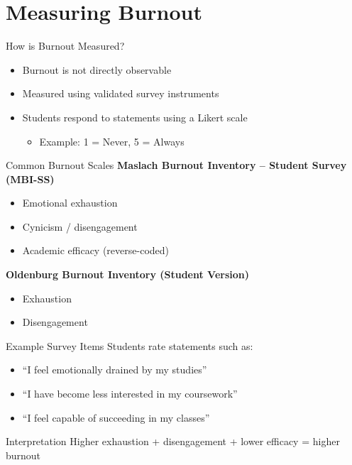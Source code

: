 \documentclass[dvipsnames]{beamer}
\begin{document}
\section{Measuring Burnout}

\begin{frame}{How is Burnout Measured?}
\begin{itemize}
    \item Burnout is not directly observable
    \item Measured using validated survey instruments
    \item Students respond to statements using a Likert scale
    \begin{itemize}
        \item Example: 1 = Never, 5 = Always
    \end{itemize}
\end{itemize}
\end{frame}


\begin{frame}{Common Burnout Scales}
\textbf{Maslach Burnout Inventory -- Student Survey (MBI-SS)}
\begin{itemize}
    \item Emotional exhaustion
    \item Cynicism / disengagement
    \item Academic efficacy (reverse-coded)
\end{itemize}



\textbf{Oldenburg Burnout Inventory (Student Version)}
\begin{itemize}
    \item Exhaustion
    \item Disengagement
\end{itemize}





\end{frame}


\begin{frame}{Example Survey Items}
Students rate statements such as:

\begin{itemize}
    \item ``I feel emotionally drained by my studies''
    \item ``I have become less interested in my coursework''
    \item ``I feel capable of succeeding in my classes''
\end{itemize}



\begin{block}{Interpretation}
Higher exhaustion + disengagement + lower efficacy = higher burnout
\end{block}

\end{frame}
\end{document}

